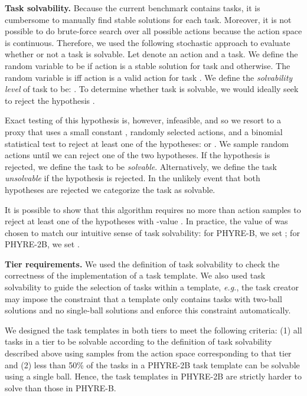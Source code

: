 \documentclass{article}
\begin{document}
\noindent\textbf{Task solvability.} Because the current benchmark contains  tasks, it is cumbersome to manually find stable solutions for each task. Moreover, it is not possible to do brute-force search over all possible actions because the action space is continuous.
Therefore, we used the following stochastic approach to evaluate whether or not a task is solvable.
Let  denote an action and  a task. We define the random variable  to be  if action  is a stable solution for task  and  otherwise. The random variable  is  iff action  is a valid action for task . We define the \emph{solvability level} of task  to be: . To determine whether task  is solvable, we would ideally seek to reject the hypothesis .

Exact testing of this hypothesis is, however, infeasible, and so we resort to a proxy that uses a small constant , randomly selected actions, and a binomial statistical test to reject at least one of the hypotheses:  or . We sample random actions until we can reject one of the two hypotheses. If the  hypothesis is rejected, we define the task to be \emph{solvable}. Alternatively, we define the task \emph{unsolvable} if the  hypothesis is rejected. In the unlikely event that both hypotheses are rejected we categorize the task as solvable.

It is possible to show that this algorithm requires no more than  action samples to reject at least one of the hypotheses with -value . In practice, the value of  was chosen to match our intuitive sense of task solvability: for PHYRE-B, we set ; for PHYRE-2B, we set .

\noindent\textbf{Tier requirements.} We used the definition of task solvability to check the correctness of the implementation of a task template. We also used task solvability to guide the selection of tasks within a template, \emph{e.g.}, the task creator may impose the constraint that a template only contains tasks with two-ball solutions and no single-ball solutions and enforce this constraint automatically.

We designed the task templates in both tiers to meet the following criteria: (1) all tasks in a tier to be solvable according to the definition of task solvability described above using samples from the action space corresponding to that tier and (2) less than 50\% of the tasks in a PHYRE-2B task template can be solvable using a single ball. Hence, the task templates in PHYRE-2B are strictly harder to solve than those in PHYRE-B.
\end{document}
